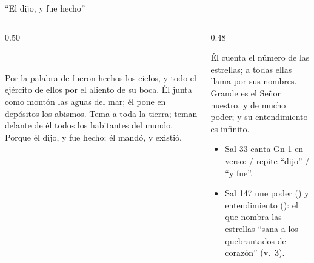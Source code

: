 \begin{frame}{``El dijo, y fue hecho''}
\begin{columns}[t,onlytextwidth]
\begin{column}{0.50\textwidth}
\begin{center}\small{}\\[1pt]\end{center}
\begin{cita}[fontupper=\scriptsize\itshape]Por la palabra de \SENOR{} fueron hechos los cielos, y todo el ejército de ellos por el aliento de su boca. Él junta como montón las aguas del mar; él pone en depósitos los abismos. Tema a \SENOR{} toda la tierra; teman delante de él todos los habitantes del mundo. Porque él dijo, y fue hecho; él mandó, y existió.\end{cita}
\end{column}
\begin{column}{0.48\textwidth}
\begin{cita}[fontupper=\scriptsize\itshape]Él cuenta el número de las estrellas; a todas ellas llama por sus nombres. Grande es el Señor nuestro, y de mucho poder; y su entendimiento es infinito.\end{cita}
\small
\begin{itemize}
\item Sal 33 canta Gn 1 en verso:  /  repite ``dijo'' / ``y fue''.
\item Sal 147 une poder () y entendimiento (): el que nombra las estrellas ``sana a los quebrantados de corazón'' (v.~3).
\end{itemize}
\end{column}
\end{columns}
\end{frame}

